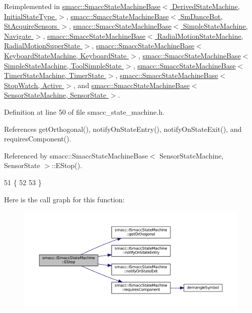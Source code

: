 Reimplemented in \hyperlink{structsmacc_1_1SmaccStateMachineBase_aa585d63332b29a61555468874b49aad3}{smacc\+::\+Smacc\+State\+Machine\+Base$<$ Derived\+State\+Machine, Initial\+State\+Type $>$}, \hyperlink{structsmacc_1_1SmaccStateMachineBase_aa585d63332b29a61555468874b49aad3}{smacc\+::\+Smacc\+State\+Machine\+Base$<$ Sm\+Dance\+Bot, St\+Acquire\+Sensors $>$}, \hyperlink{structsmacc_1_1SmaccStateMachineBase_aa585d63332b29a61555468874b49aad3}{smacc\+::\+Smacc\+State\+Machine\+Base$<$ Simple\+State\+Machine, Navigate $>$}, \hyperlink{structsmacc_1_1SmaccStateMachineBase_aa585d63332b29a61555468874b49aad3}{smacc\+::\+Smacc\+State\+Machine\+Base$<$ Radial\+Motion\+State\+Machine, Radial\+Motion\+Super\+State $>$}, \hyperlink{structsmacc_1_1SmaccStateMachineBase_aa585d63332b29a61555468874b49aad3}{smacc\+::\+Smacc\+State\+Machine\+Base$<$ Keyboard\+State\+Machine, Keyboard\+State $>$}, \hyperlink{structsmacc_1_1SmaccStateMachineBase_aa585d63332b29a61555468874b49aad3}{smacc\+::\+Smacc\+State\+Machine\+Base$<$ Simple\+State\+Machine, Tool\+Simple\+State $>$}, \hyperlink{structsmacc_1_1SmaccStateMachineBase_aa585d63332b29a61555468874b49aad3}{smacc\+::\+Smacc\+State\+Machine\+Base$<$ Timer\+State\+Machine, Timer\+State $>$}, \hyperlink{structsmacc_1_1SmaccStateMachineBase_aa585d63332b29a61555468874b49aad3}{smacc\+::\+Smacc\+State\+Machine\+Base$<$ Stop\+Watch, Active $>$}, and \hyperlink{structsmacc_1_1SmaccStateMachineBase_aa585d63332b29a61555468874b49aad3}{smacc\+::\+Smacc\+State\+Machine\+Base$<$ Sensor\+State\+Machine, Sensor\+State $>$}.



Definition at line 50 of file smacc\+\_\+state\+\_\+machine.\+h.



References get\+Orthogonal(), notify\+On\+State\+Entry(), notify\+On\+State\+Exit(), and requires\+Component().



Referenced by smacc\+::\+Smacc\+State\+Machine\+Base$<$ Sensor\+State\+Machine, Sensor\+State $>$\+::\+E\+Stop().


\begin{DoxyCode}
51     \{
52 
53     \}
\end{DoxyCode}


Here is the call graph for this function\+:
\nopagebreak
\begin{figure}[H]
\begin{center}
\leavevmode
\includegraphics[width=350pt]{classsmacc_1_1ISmaccStateMachine_af79fbc17f064bba77e598f5e55a86200_cgraph}
\end{center}
\end{figure}




